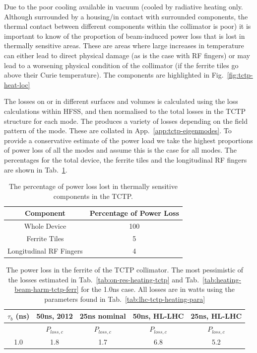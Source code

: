 Due to the poor cooling available in vacuum (cooled by radiative heating only. Although surrounded by a housing/in contact with surrounded components, the thermal contact between different components within the collimator is poor) it is important to know of the proportion of beam-induced power loss that is lost in thermally sensitive areas. These are areas where large increases in temperature can either lead to direct physical damage (as is the case with RF fingers) or may lead to a worsening physical condition of the collimator (if the ferrite tiles go above their Curie temperature). The components are highlighted in Fig.~\ref{fig:tctp-heat-loc}

The losses on or in different surfaces and volumes is calculated using the loss calculations within HFSS, and then normalised to the total losses in the TCTP structure for each mode. The produces a variety of losses depending on the field pattern of the mode. These are collated in App.~\ref{app:tctp-eigenmodes}. To provide a conservative estimate of the power load we take the highest proportions of power loss of all the modes and assume this is the case for all modes. The percentages for the total device, the ferrite tiles and the longitudinal RF fingers are shown in Tab.~\ref{tab:tctp-heating-loc}. 

\begin{table}
\label{tab:tctp-heating-loc}
\caption{The percentage of power loss lost in thermally sensitive components in the TCTP.}
\begin{center}
\begin{tabular}{c | c}
Component & Percentage of Power Loss \\ \hline
Whole Device & 100 \\ \hline
Ferrite Tiles & 5 \\ \hline
Longitudinal RF Fingers & 4 \\
\end{tabular}
\end{center}
\end{table}

\begin{table}
\label{tab:heating-ferr-power-load}
\caption{The power loss in the ferrite of the TCTP collimator. The most pessimistic of the losses estimated in Tab.~\ref{tab:on-res-heating-tctp} and Tab.~\ref{tab:heating-beam-harm-tctp-ferr} for the 1.0ns case. All losses are in watts using the parameters found in Tab.~\ref{tab:lhc-tctp-heating-para}}
\begin{center}
\begin{tabular}{c | c | c | c | c }
$\tau_{b}$ (ns) & 50ns, 2012 & 25ns nominal & 50ns, HL-LHC & 25ns, HL-LHC \\ \hline
 &  $P_{loss, c}$  & $P_{loss, c}$ &  $P_{loss, c}$  & $P_{loss, c}$ \\ \hline
1.0 & 1.8 & 1.7 & 6.8 & 5.2 
\end{tabular}
\end{center}
\end{table}


